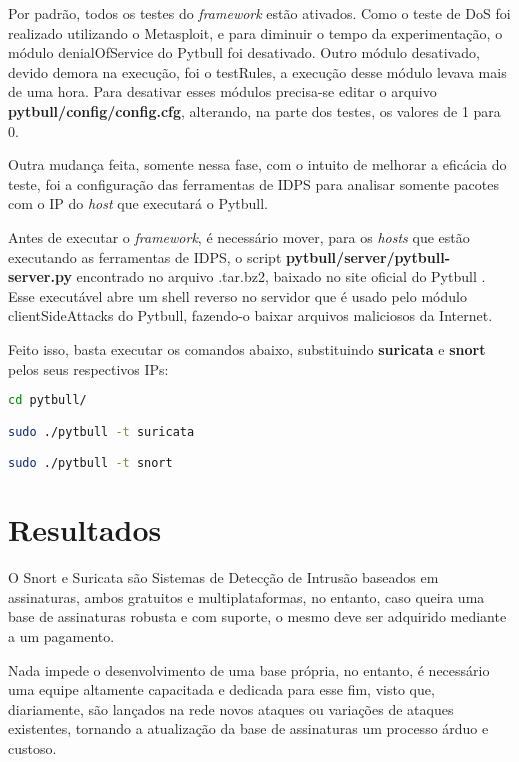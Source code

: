 Por padrão, todos os testes do \textit{framework} estão ativados. Como o teste de DoS foi realizado utilizando o Metasploit, e para diminuir o tempo da experimentação, o módulo denialOfService do Pytbull foi desativado. Outro módulo desativado, devido demora na execução, foi o testRules, a execução desse módulo levava mais de uma hora. Para desativar esses módulos precisa-se editar o arquivo \textbf{pytbull/config/config.cfg}, alterando, na parte dos testes, os valores de 1 para 0.

Outra mudança feita, somente nessa fase, com o intuito de melhorar a eficácia do teste, foi a configuração das ferramentas de IDPS para analisar somente pacotes com o IP do \textit{host} que executará o Pytbull. 

Antes de executar o \textit{framework}, é necessário mover, para os \textit{hosts} que estão executando as ferramentas de IDPS, o script \textbf{pytbull/server/pytbull-server.py} encontrado no arquivo .tar.bz2, baixado no site oficial do Pytbull \cite{pytbull}. Esse executável abre um shell reverso no servidor que é usado pelo módulo clientSideAttacks do Pytbull, fazendo-o baixar arquivos maliciosos da Internet. 

Feito isso, basta executar os comandos abaixo, substituindo \textbf{suricata} e \textbf{snort} pelos seus respectivos IPs:

\begin{lstlisting}[caption={Comandos usados para execução do Pytbull}, language=bash, frame=single, label={lst:pytbull}]
cd pytbull/

sudo ./pytbull -t suricata

sudo ./pytbull -t snort
\end{lstlisting}

\section{Resultados} \label{sec:resultados}
O Snort e Suricata são Sistemas de Detecção de Intrusão baseados em assinaturas, ambos gratuitos e multiplataformas, no entanto, caso queira uma base de assinaturas robusta e com suporte, o mesmo deve ser adquirido mediante a um pagamento. 

Nada impede o desenvolvimento de uma base própria, no entanto, é necessário uma equipe altamente capacitada e dedicada para esse fim, visto que, diariamente, são lançados na rede novos ataques ou variações de ataques existentes, tornando a atualização da base de assinaturas um processo árduo e custoso.

